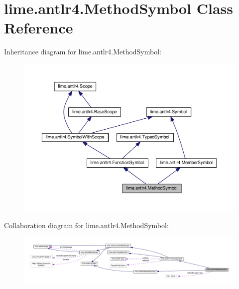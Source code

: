 \hypertarget{classlime_1_1antlr4_1_1MethodSymbol}{}\section{lime.\+antlr4.\+Method\+Symbol Class Reference}
\label{classlime_1_1antlr4_1_1MethodSymbol}


Inheritance diagram for lime.\+antlr4.\+Method\+Symbol\+:
\nopagebreak
\begin{figure}[H]
\begin{center}
\leavevmode
\includegraphics[width=350pt]{classlime_1_1antlr4_1_1MethodSymbol__inherit__graph}
\end{center}
\end{figure}


Collaboration diagram for lime.\+antlr4.\+Method\+Symbol\+:
\nopagebreak
\begin{figure}[H]
\begin{center}
\leavevmode
\includegraphics[width=350pt]{classlime_1_1antlr4_1_1MethodSymbol__coll__graph}
\end{center}
\end{figure}
